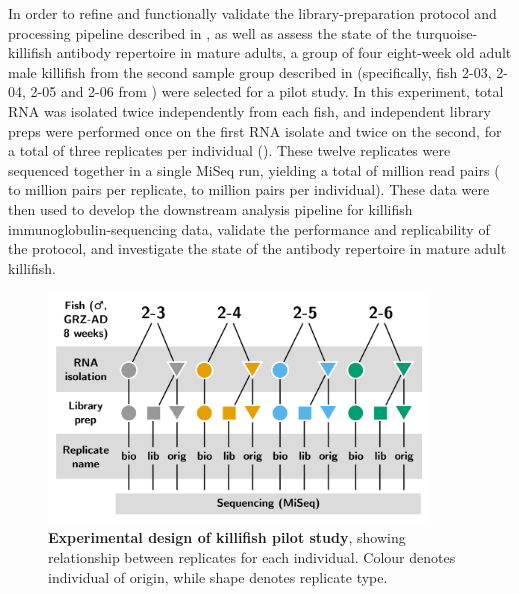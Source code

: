 In order to refine and functionally validate the library-preparation protocol and processing pipeline described in , as well as assess the state of the turquoise-killifish antibody repertoire in mature adults, a group of four eight-week old adult male killifish from the second sample group described in  (specifically, fish 2-03, 2-04, 2-05 and 2-06 from ) were selected for a pilot study. In this experiment, total RNA was isolated twice independently from each fish, and independent library preps were performed once on the first RNA isolate and twice on the second, for a total of three replicates per individual (). These twelve replicates were sequenced together in a single MiSeq run, yielding a total of  million read pairs ( to  million pairs per replicate,  to  million pairs per individual). These data were then used to develop the downstream analysis pipeline for killifish immunoglobulin-sequencing data, validate the performance and replicability of the protocol, and investigate the state of the antibody repertoire in mature adult killifish.

\begin{figure}
\centering
\includegraphics[width = 0.9\textwidth]{_Figures/png_edited/igseq-pilot-design_wide.png}
\caption[Experimental design of killifish \igseq pilot study]{\textbf{Experimental design of killifish \igseq pilot study}, showing relationship between replicates for each individual. Colour denotes individual of origin, while shape denotes replicate type.}
\label{fig:igseq-pilot-design}
\end{figure}

